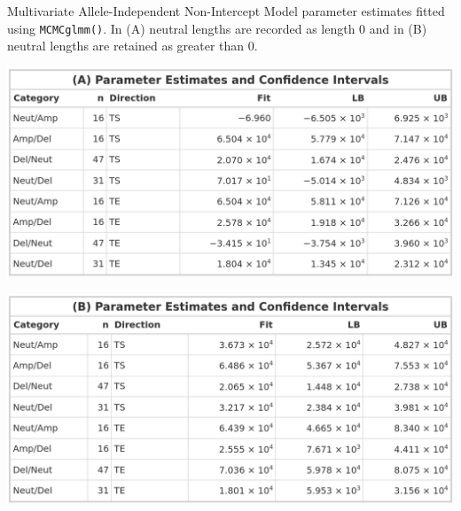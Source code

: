 \begin{table}[!htb]
    \caption[Multivariate Allele-Independent Non-Intercept Model parameter estimates fitted using \texttt{MCMCglmm()}.]{Multivariate Allele-Independent Non-Intercept Model parameter estimates fitted using \texttt{MCMCglmm()}. In (A) neutral lengths are recorded as length 0 and in (B) neutral lengths are retained as greater than 0.}
     \begin{subtable}[t]{.49\textwidth}
      \centering
      \includegraphics[width = 1\textwidth]{../tables/Chapter_5/Multivariate_MCMC_6_AI_Pred.png}
    \end{subtable}%
    \hspace{0.5cm}
     \begin{subtable}[t]{.49\textwidth}
      \centering
         \includegraphics[width = 1\textwidth]{../tables/Chapter_5/Multivariate_MCMC_6_Neut_AI_Pred.png}
    \end{subtable} 
\end{table}

